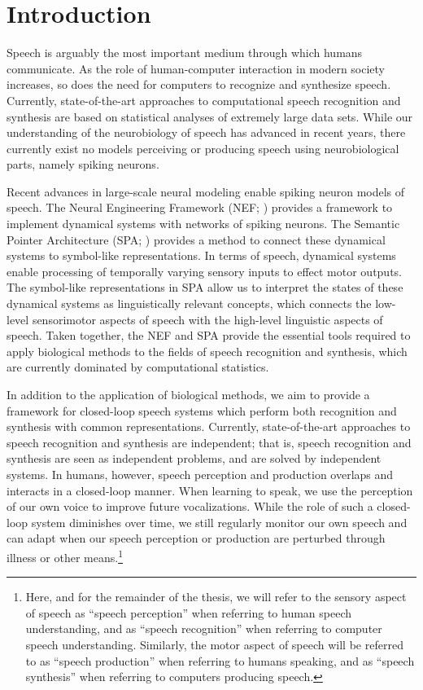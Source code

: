 \chapter{Introduction}

Speech is arguably the most important
medium through which humans communicate.
As the role of human-computer interaction
in modern society increases,
so does the need for computers
to recognize and synthesize speech.
Currently, state-of-the-art approaches
to computational
speech recognition and synthesis
are based on statistical analyses
of extremely large data sets.
While our understanding
of the neurobiology of speech has advanced
in recent years,
there currently exist no
models perceiving or producing speech
using neurobiological parts,
namely spiking neurons.

Recent advances in large-scale neural modeling
enable spiking neuron models of speech.
The Neural Engineering Framework (NEF; \cite{eliasmith2004})
provides a framework to implement
dynamical systems with networks of spiking neurons.
The Semantic Pointer Architecture (SPA; \cite{eliasmith2013})
provides a method to connect these dynamical systems
to symbol-like representations.
In terms of speech,
dynamical systems enable processing of
temporally varying sensory inputs
to effect motor outputs.
The symbol-like representations in SPA
allow us to interpret the states
of these dynamical systems
as linguistically relevant concepts,
which connects the low-level
sensorimotor aspects of speech
with the high-level linguistic aspects of speech.
Taken together, the NEF and SPA
provide the essential tools required
to apply biological methods
to the fields of
speech recognition and synthesis,
which are currently dominated
by computational statistics.

In addition to the application of biological methods,
we aim to provide a framework for
closed-loop speech systems
which perform both recognition and synthesis
with common representations.
Currently, state-of-the-art approaches
to speech recognition and synthesis
are independent;
that is, speech recognition and synthesis
are seen as independent problems,
and are solved by independent systems.
In humans, however,
speech perception and production
overlaps and interacts in a closed-loop manner.
When learning to speak,
we use the perception of our own voice
to improve future vocalizations.
While the role of such a closed-loop system
diminishes over time,
we still regularly monitor
our own speech and can adapt
when our speech perception or production
are perturbed through illness
or other means.\footnote{
  Here, and for the remainder of the thesis,
  we will refer to the sensory aspect
  of speech as ``speech perception''
  when referring to human speech understanding,
  and as ``speech recognition''
  when referring to computer speech understanding.
  Similarly, the motor aspect of speech
  will be referred to as
  ``speech production''
  when referring to humans speaking,
  and as ``speech synthesis''
  when referring to computers producing speech.}

